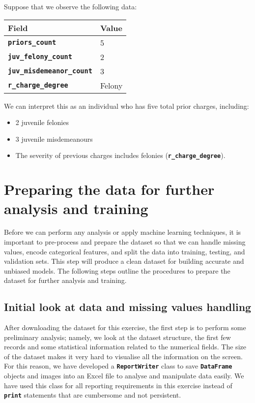 \documentclass[conference]{IEEEtran}
\begin{document}
	Suppose that we observe the following data:
	
	
	\begin{table}[!ht]
		\centering
		\begin{tabular}{|l|l|}
			\hline
			Field & Value \\ \hline
			\textbf{\texttt{priors\_count}} & 5 \\ \hline
			\textbf{\texttt{juv\_felony\_count}} & 2 \\ \hline
			\textbf{\texttt{juv\_misdemeanor\_count}} & 3 \\ \hline
			\textbf{\texttt{r\_charge\_degree}} & Felony \\ \hline
		\end{tabular}
	\end{table}
	
	We can interpret this as an  individual who has five total prior charges, including:
	
	\begin{itemize}
		\item 2 juvenile felonies
		\item 3 juvenile misdemeanours
		\item The severity of previous charges includes felonies (\textbf{\texttt{r\_charge\_degree}}).
	\end{itemize}
	


	\section{Preparing the data for further analysis and training}
	
	Before we can perform any analysis or apply machine learning techniques, it is important to pre-process and prepare the dataset so that we can handle missing values, encode categorical features, and split the data into training, testing, and validation sets. This step will produce a clean dataset for building accurate and unbiased models. The following steps outline the procedures to prepare the dataset for further analysis and training.
	
	\subsection{Initial look at data and missing values handling}
	After downloading the dataset for this exercise, the first step is to perform some preliminary analysis; namely, we look at the dataset structure, the first few records and some statistical information related to the numerical fields. The size of the dataset makes it very hard to visualise all the information on the screen. For this reason, we have developed a \textbf{\texttt{ReportWriter}}  class to save \textbf{\texttt{DataFrame}}  objects and images into an Excel file to analyse and manipulate data easily. We have used this class for all reporting requirements in this exercise instead of \textbf{\texttt{print}}  statements that are cumbersome and not persistent.
	
\end{document}
